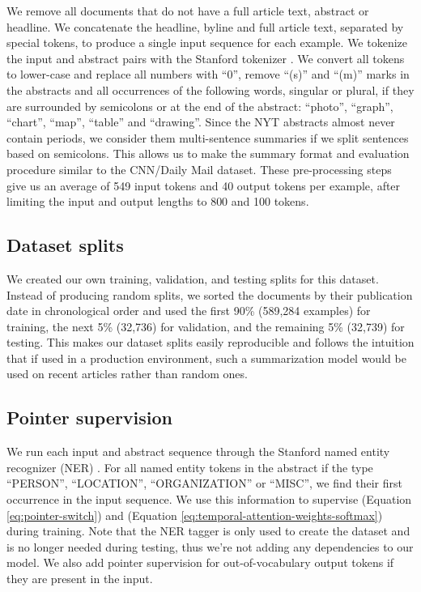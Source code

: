 \documentclass{article} \usepackage{iclr2018_arxiv,times}
\begin{document}
We remove all documents that do not have a full article text, abstract or headline. We concatenate the headline, byline and full article text, separated by special tokens, to produce a single input sequence for each example. We tokenize the input and abstract pairs with the Stanford tokenizer \citep{manning2014}. We convert all tokens to lower-case and replace all numbers with ``0'', remove ``(s)'' and ``(m)'' marks in the abstracts and all occurrences of the following words, singular or plural, if they are surrounded by semicolons or at the end of the abstract: ``photo'', ``graph'', ``chart'', ``map'', ``table'' and ``drawing''. Since the NYT abstracts almost never contain periods, we consider them multi-sentence summaries if we split sentences based on semicolons. This allows us to make the summary format and evaluation procedure similar to the CNN/Daily Mail dataset. These pre-processing steps give us an average of 549 input tokens and 40 output tokens per example, after limiting the input and output lengths to 800 and 100 tokens.

\subsection{Dataset splits}
We created our own training, validation, and testing splits for this dataset. Instead of producing random splits, we sorted the documents by their publication date in chronological order and used the first 90\% (589,284 examples) for training, the next 5\% (32,736) for validation, and the remaining 5\% (32,739) for testing. This makes our dataset splits easily reproducible and follows the intuition that if used in a production environment, such a summarization model would be used on recent articles rather than random ones.

\subsection{Pointer supervision}
\label{section:nyt-pointer-supervision}

We run each input and abstract sequence through the Stanford named entity recognizer (NER) \citep{manning2014}. For all named entity tokens in the abstract if the type ``PERSON'', ``LOCATION'', ``ORGANIZATION'' or ``MISC'', we find their first occurrence in the input sequence. We use this information to supervise  (Equation \ref{eq:pointer-switch}) and  (Equation \ref{eq:temporal-attention-weights-softmax}) during training. Note that the NER tagger is only used to create the dataset and is no longer needed during testing, thus we're not adding any dependencies to our model. We also add pointer supervision for out-of-vocabulary output tokens if they are present in the input.
\end{document}
